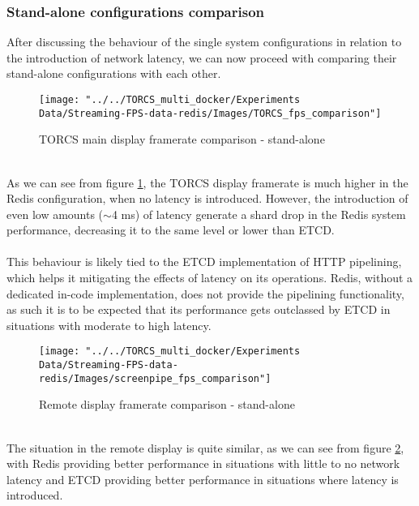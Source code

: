 \subsubsection{Stand-alone configurations comparison}
After discussing the behaviour of the single system configurations in relation to the introduction of network latency, we can now proceed with comparing their stand-alone configurations with each other.
\begin{figure}[h!]
	\centering
	\texttt{[image: "../../TORCS\_multi\_docker/Experiments Data/Streaming-FPS-data-redis/Images/TORCS\_fps\_comparison"]}
	\caption[TORCS main display framerate comparison - stand-alone]{TORCS main display framerate comparison - stand-alone}
	\label{fig:torcs-fps-comparison}
\end{figure}
\\ As we can see from figure \ref{fig:torcs-fps-comparison}, the TORCS display framerate is much higher in the Redis configuration, when no latency is introduced. However, the introduction of even low amounts ($\sim{}$4 ms) of latency generate a shard drop in the Redis system performance, decreasing it to the same level or lower than ETCD. \\ \\
This behaviour is likely tied to the ETCD implementation of HTTP pipelining, which helps it mitigating the effects of latency on its operations. Redis, without a dedicated in-code implementation, does not provide the pipelining functionality, as such it is to be expected that its performance gets outclassed by ETCD in situations with moderate to high latency.
\begin{figure}[h!]
	\centering
	\texttt{[image: "../../TORCS\_multi\_docker/Experiments Data/Streaming-FPS-data-redis/Images/screenpipe\_fps\_comparison"]}
	\caption[Remote display framerate comparison - stand-alone]{Remote display framerate comparison - stand-alone}
	\label{fig:screenpipe-fps-comparison}
\end{figure}
\\ The situation in the remote display is quite similar, as we can see from figure \ref{fig:screenpipe-fps-comparison}, with Redis providing better performance in situations with little to no network latency and ETCD providing better performance in situations where latency is introduced.

